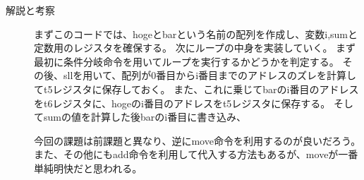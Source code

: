 \documentclass{jsarticle}
\begin{document}
\begin{description}
\begin{description}
          \item[解説と考察]
          まずこのコードでは、hogeとbarという名前の配列を作成し、変数i,sumと定数用のレジスタを確保する。
          次にループの中身を実装していく。
          まず最初に条件分岐命令を用いてループを実行するかどうかを判定する。
          その後、sllを用いて、配列が0番目からi番目までのアドレスのズレを計算してt5レジスタに保存しておく。
          また、これに乗じてbarのi番目のアドレスをt6レジスタに、hogeのi番目のアドレスをt5レジスタに保存する。
          そしてsumの値を計算した後barのi番目に書き込み、

          今回の課題は前課題と異なり、逆にmove命令を利用するのが良いだろう。
          また、その他にもadd命令を利用して代入する方法もあるが、moveが一番単純明快だと思われる。
      \end{description}
  \end{description}
\end{document}

